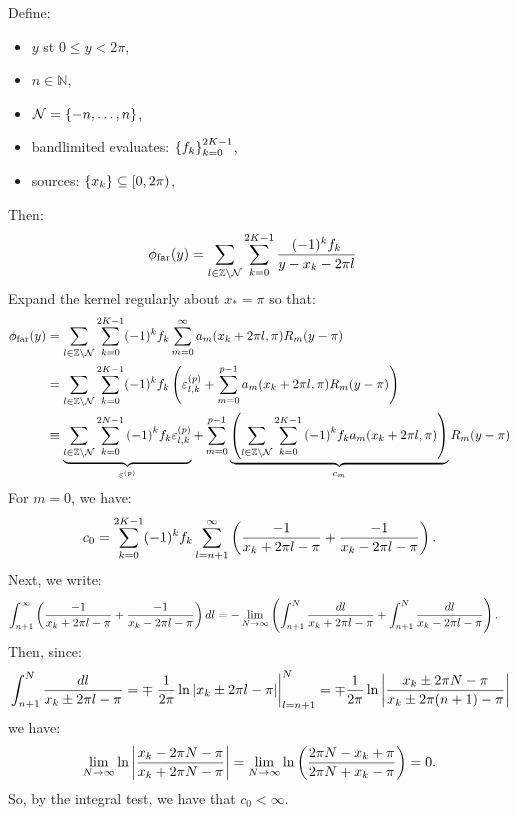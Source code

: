 \documentclass{article}
\begin{document}
\noindent Define:
\begin{itemize}
\item $y$ st $0 \leq y < 2\pi$,
\item $n \in \mathbb{N}$,
\item $\mathcal{N} = \left\{-n, \hdots, n\right\}$,
\item bandlimited evaluates: $\left\{f_k\right\}_{k=0}^{2K-1}$,
\item sources: $\left\{x_k\right\} \subseteq [0, 2\pi)$,
\end{itemize}
Then:
\begin{align*}
  \phi_{\operatorname{far}}(y) &= \sum_{l \in \mathbb{Z} \backslash \mathcal{N}} \sum_{k=0}^{2K-1} \frac{(-1)^k f_k}{y - x_k - 2\pi l}
\end{align*}
Expand the kernel regularly about $x_* = \pi$ so that:
\begin{align*}
  \phi_{\operatorname{far}}(y) &= \sum_{l \in \mathbb{Z} \backslash \mathcal{N}} \sum_{k=0}^{2K-1} (-1)^k f_k \sum_{m=0}^\infty a_m(x_k + 2\pi l, \pi) R_m(y - \pi) \\
  &= \sum_{l \in \mathbb{Z} \backslash \mathcal{N}} \sum_{k=0}^{2K-1} (-1)^k f_k \left(\varepsilon_{l,k}^{(p)} + \sum_{m=0}^{p-1} a_m(x_k + 2\pi l, \pi) R_m(y - \pi)\right) \\
  &\equiv \underbrace{\sum_{l \in \mathbb{Z} \backslash \mathcal{N}} \sum_{k=0}^{2N-1} {(-1)}^k f_k \varepsilon_{l,k}^{(p)}}_{\varepsilon^{(p)}} + \sum_{m=0}^{p-1} \underbrace{\left(\sum_{l \in \mathbb{Z} \backslash \mathcal{N}} \sum_{k=0}^{2K-1} {(-1)}^k f_k a_m(x_k + 2\pi l, \pi)\right)}_{c_m} R_m(y - \pi)
\end{align*}
For $m=0$, we have:
\begin{align*}
  c_0 = \sum_{k=0}^{2K-1} (-1)^k f_k \sum_{l = n+1}^\infty \left(\frac{-1}{x_k + 2\pi l - \pi} + \frac{-1}{x_k - 2\pi l - \pi}\right).
\end{align*}
Next, we write:
\begin{align*}
  \int_{n+1}^\infty &\left(\frac{-1}{x_k + 2\pi l - \pi} + \frac{-1}{x_k - 2\pi l - \pi}\right) dl = -\lim_{N \to \infty} \left(\int_{n+1}^N \frac{dl}{x_k + 2\pi l - \pi} + \int_{n+1}^N \frac{dl}{x_k - 2\pi l - \pi}\right).
\end{align*}
Then, since:
\begin{align*}
  \int_{n+1}^N \frac{dl}{x_k \pm 2 \pi l - \pi} = \mp \left. \frac{1}{2 \pi} \ln |x_k \pm 2 \pi l - \pi| \right|_{l=n+1}^N = \mp \frac{1}{2\pi} \ln \left|\frac{x_k \pm 2 \pi N - \pi}{x_k \pm 2 \pi (n+1) - \pi}\right|
\end{align*}
we have:
\begin{align*}
  \lim_{N\to\infty} \ln \left|\frac{x_k - 2\pi N - \pi}{x_k + 2\pi N - \pi}\right| = \lim_{N \to \infty} \ln \left(\frac{2 \pi N - x_k + \pi}{2 \pi N + x_k - \pi}\right) = 0.
\end{align*}
So, by the integral test, we have that $c_0 < \infty$.
\end{document}

